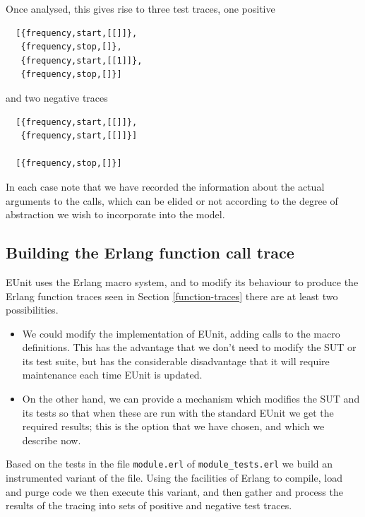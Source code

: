 \documentclass[]{sigplanconf}
\begin{document}
Once analysed, this gives rise to three test traces, one positive
\begin{verbatim}
  [{frequency,start,[[]]},
   {frequency,stop,[]},
   {frequency,start,[[1]]},
   {frequency,stop,[]}]
\end{verbatim}
and two negative traces
\begin{verbatim}
  [{frequency,start,[[]]},
   {frequency,start,[[]]}]
   
  [{frequency,stop,[]}]
\end{verbatim}
In each case note that we have recorded the information about the actual arguments to the calls, which can be elided or not according to the degree of abstraction we wish to incorporate into the model.

\subsection{Building the Erlang function call trace}

EUnit uses the Erlang macro system, and to modify its behaviour to produce the Erlang function traces seen in Section \ref{function-traces} there are at least two possibilities.
\begin{itemize}
\item
We could modify the implementation of EUnit, adding calls to the macro definitions. This has the advantage that we don't need to modify the SUT or its test suite, but has the considerable disadvantage that it will require maintenance each time EUnit is updated.
\item
On the other hand, we can provide a mechanism which modifies the SUT and its tests so that when these are run with the standard EUnit we get the required results; this is the option that we have chosen, and which we describe now.
\end{itemize}
Based on the tests in the file \texttt{module.erl} of \texttt{module\_tests.erl} we build an instrumented variant of the file. Using the facilities of Erlang to compile, load and purge code we then execute this variant, and then gather and process the results of the tracing into sets of positive and negative test traces.
\end{document}
